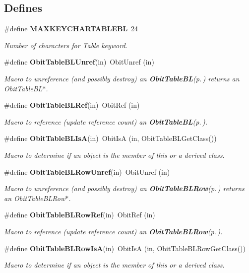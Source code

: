 \subsection*{Defines}
\begin{CompactItemize}
\item 
\#define {\bf MAXKEYCHARTABLEBL}\ 24
\begin{CompactList}\small\item\em Number of characters for Table keyword. \item\end{CompactList}\item 
\#define {\bf Obit\-Table\-BLUnref}(in)\ Obit\-Unref (in)
\begin{CompactList}\small\item\em Macro to unreference (and possibly destroy) an {\bf Obit\-Table\-BL}{\rm (p.\,\pageref{structObitTableBL})} returns an Obit\-Table\-BL$\ast$. \item\end{CompactList}\item 
\#define {\bf Obit\-Table\-BLRef}(in)\ Obit\-Ref (in)
\begin{CompactList}\small\item\em Macro to reference (update reference count) an {\bf Obit\-Table\-BL}{\rm (p.\,\pageref{structObitTableBL})}. \item\end{CompactList}\item 
\#define {\bf Obit\-Table\-BLIs\-A}(in)\ Obit\-Is\-A (in, Obit\-Table\-BLGet\-Class())
\begin{CompactList}\small\item\em Macro to determine if an object is the member of this or a derived class. \item\end{CompactList}\item 
\#define {\bf Obit\-Table\-BLRow\-Unref}(in)\ Obit\-Unref (in)
\begin{CompactList}\small\item\em Macro to unreference (and possibly destroy) an {\bf Obit\-Table\-BLRow}{\rm (p.\,\pageref{structObitTableBLRow})} returns an Obit\-Table\-BLRow$\ast$. \item\end{CompactList}\item 
\#define {\bf Obit\-Table\-BLRow\-Ref}(in)\ Obit\-Ref (in)
\begin{CompactList}\small\item\em Macro to reference (update reference count) an {\bf Obit\-Table\-BLRow}{\rm (p.\,\pageref{structObitTableBLRow})}. \item\end{CompactList}\item 
\#define {\bf Obit\-Table\-BLRow\-Is\-A}(in)\ Obit\-Is\-A (in, Obit\-Table\-BLRow\-Get\-Class())
\begin{CompactList}\small\item\em Macro to determine if an object is the member of this or a derived class. \item\end{CompactList}\end{CompactItemize}
